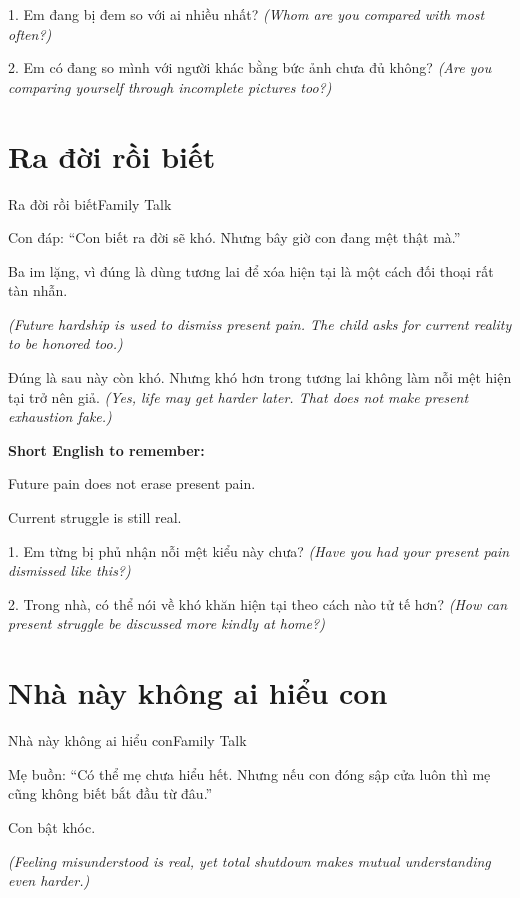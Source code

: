 \begin{tuhocnhanh}
1. Em đang bị đem so với ai nhiều nhất? \textit{(Whom are you compared with most often?)}

2. Em có đang so mình với người khác bằng bức ảnh chưa đủ không? \textit{(Are you comparing yourself through incomplete pictures too?)}
\end{tuhocnhanh}
\ngancach

\section{Ra đời rồi biết}
\begin{truyen}{Ra đời rồi biết}{Family Talk}

Con đáp: ``Con biết ra đời sẽ khó. Nhưng bây giờ con đang mệt thật mà.''

Ba im lặng, vì đúng là dùng tương lai để xóa hiện tại là một cách đối thoại rất tàn nhẫn.

\textit{(Future hardship is used to dismiss present pain. The child asks for current reality to be honored too.)}
\end{truyen}

\begin{baihoc}
Đúng là sau này còn khó. Nhưng khó hơn trong tương lai không làm nỗi mệt hiện tại trở nên giả.
\textit{(Yes, life may get harder later. That does not make present exhaustion fake.)}
\end{baihoc}

\begin{ghinhoanh}
\textbf{Short English to remember:}

Future pain does not erase present pain.

Current struggle is still real.
\end{ghinhoanh}

\begin{tuhocnhanh}
1. Em từng bị phủ nhận nỗi mệt kiểu này chưa? \textit{(Have you had your present pain dismissed like this?)}

2. Trong nhà, có thể nói về khó khăn hiện tại theo cách nào tử tế hơn? \textit{(How can present struggle be discussed more kindly at home?)}
\end{tuhocnhanh}
\ngancach

\section{Nhà này không ai hiểu con}
\begin{truyen}{Nhà này không ai hiểu con}{Family Talk}

Mẹ buồn: ``Có thể mẹ chưa hiểu hết. Nhưng nếu con đóng sập cửa luôn thì mẹ cũng không biết bắt đầu từ đâu.''

Con bật khóc.

\textit{(Feeling misunderstood is real, yet total shutdown makes mutual understanding even harder.)}
\end{truyen}

